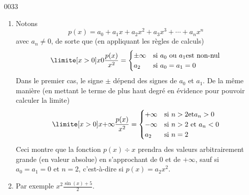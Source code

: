 
\begin{corrige}{0033}

\begin{enumerate}
\item Notons
  \begin{equation*}
    p(x) = a_0 + a_1 x + a_2 x^2 + a_3 x^3 + \cdots + a_n x^n
  \end{equation*}
  avec $a_n \neq 0$, de sorte que (en appliquant les règles de
  calculs)
  \begin{equation*}
    \limite[x > 0] x 0 \frac{p(x)}{x^2} =
    \begin{cases}
        \pm\infty & \text{si }a_0 \text{ ou } a_1 \text{est non-nul}\\
      a_2 & \text{si }a_0 = a_1 = 0
    \end{cases}
  \end{equation*}
	Dans le premier cas, le signe $\pm$ dépend des signes de $a_0$ et $a_1$.
  De la même manière (en mettant le terme de plus haut degré en
  évidence pour pouvoir calculer la limite)
  \begin{equation*}
    \limite[x > 0] x {+\infty} \frac{p(x)}{x^2} =
    \begin{cases}
        +\infty & \text{si }n > 2 \text{et} a_n>0\\
        -\infty & \text{si }n > 2 \text{ et } a_n<0\\
      a_2 & \text{si }n = 2
    \end{cases}
  \end{equation*}
  Ceci montre que la fonction $p(x) \div x$ prendra des valeurs
  arbitrairement grande (en valeur absolue) en s'approchant de $0$ et
  de $+\infty$, sauf si $a_0 = a_1 = 0$ et $n = 2$, c'est-à-dire si
  $p(x) = a_2 x^2$.

\item Par exemple $x^2 {\frac{\sin(x)+ 5}{2}}$.
\end{enumerate}

\end{corrige}
